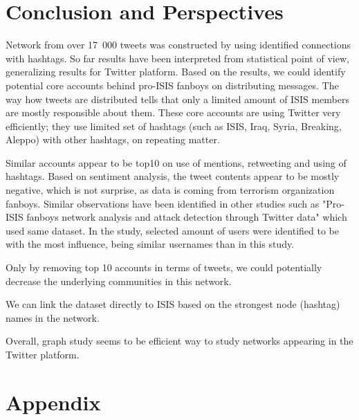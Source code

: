 \documentclass[conference]{IEEEtran}
\begin{document}
    \section{Conclusion and Perspectives}\label{sec:conclusion-and-perspectives}

    Network from over 17~000 tweets was constructed by using identified connections with hashtags.
    So far results have been interpreted from statistical point of view, generalizing results for Twitter platform.
    Based on the results, we could identify potential core accounts behind pro-ISIS fanboys on distributing messages.
    The way how tweets are distributed tells that only a limited amount of ISIS members are mostly responsible about them.
    These core accounts are using Twitter very efficiently; they use limited set of hashtags (such as ISIS, Iraq, Syria, Breaking, Aleppo) with other hashtags, on repeating matter.

    Similar accounts appear to be top10 on use of mentions, retweeting and using of hashtags.
    Based on sentiment analysis, the tweet contents appear to be mostly negative, which is not surprise, as data is coming from terrorism organization fanboys.
    Similar observations have been identified in other studies such as "Pro-ISIS fanboys network analysis and attack detection through Twitter data"\cite{8078846} which used same dataset.
    In the study, selected amount of users were identified to be with the most influence, being similar usernames than in this study.

    Only by removing top 10 accounts in terms of tweets, we could potentially decrease the underlying communities in this network.

    We can link the dataset directly to ISIS based on the strongest node (hashtag) names in the network.

    Overall, graph study seems to be efficient way to study networks appearing in the Twitter platform.



    
    


    \section*{Appendix}
\end{document}
